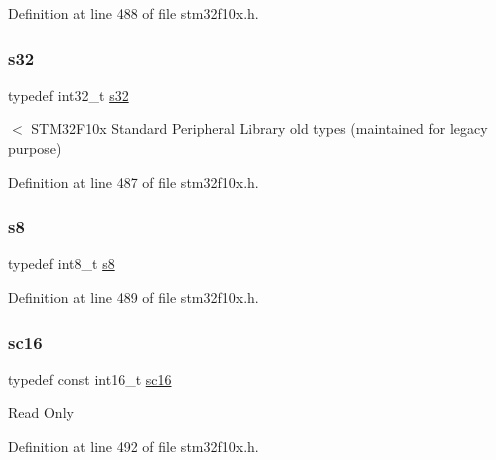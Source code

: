 Definition at line 488 of file stm32f10x.\+h.

\mbox{\label{group___exported__types_gae9b1af5c037e57a98884758875d3a7c4}} 
\subsubsection{\texorpdfstring{s32}{s32}}
{\footnotesize\ttfamily typedef int32\+\_\+t \hyperlink{group___exported__types_gae9b1af5c037e57a98884758875d3a7c4}{s32}}

$<$ S\+T\+M32\+F10x Standard Peripheral Library old types (maintained for legacy purpose) 

Definition at line 487 of file stm32f10x.\+h.

\mbox{\label{group___exported__types_ga9e382f207c65ca13ab4ae98363aeda80}} 
\subsubsection{\texorpdfstring{s8}{s8}}
{\footnotesize\ttfamily typedef int8\+\_\+t \hyperlink{group___exported__types_ga9e382f207c65ca13ab4ae98363aeda80}{s8}}



Definition at line 489 of file stm32f10x.\+h.

\mbox{\label{group___exported__types_ga66ab742a0751bb4e7661b8e874f2ddda}} 
\subsubsection{\texorpdfstring{sc16}{sc16}}
{\footnotesize\ttfamily typedef const int16\+\_\+t \hyperlink{group___exported__types_ga66ab742a0751bb4e7661b8e874f2ddda}{sc16}}

Read Only 

Definition at line 492 of file stm32f10x.\+h.

\mbox{\label{group___exported__types_gad97679599f3791409523fdb1c6156a28}} 
